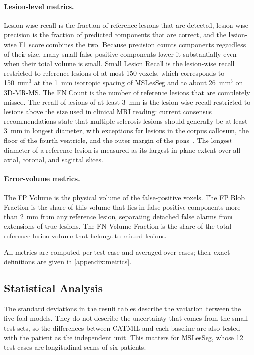 \paragraph{Lesion-level metrics.}
Lesion-wise recall is the fraction of reference lesions that are detected,
lesion-wise precision is the fraction of predicted components that are
correct, and the lesion-wise F1 score combines the two. Because precision
counts components regardless of their size, many small false-positive
components lower it substantially even when their total volume is small.
Small Lesion Recall is the lesion-wise recall restricted to reference
lesions of at most 150 voxels, which corresponds to 150~mm$^3$ at the 1~mm
isotropic spacing of MSLesSeg and to about 26~mm$^3$ on 3D-MR-MS. The FN
Count is the number of reference lesions that are completely missed. The
recall of lesions of at least 3~mm is the lesion-wise recall restricted to
lesions above the size used in clinical MRI reading: current consensus
recommendations state that multiple sclerosis lesions should generally be
at least 3~mm in longest diameter, with exceptions for lesions in the
corpus callosum, the floor of the fourth ventricle, and the outer margin
of the pons~\cite{barkhof_2024_2025,filippi_mri_2016}. The longest diameter
of a reference lesion is measured as its largest in-plane extent over all
axial, coronal, and sagittal slices.

\paragraph{Error-volume metrics.}
The FP Volume is the physical volume of the false-positive voxels. The FP
Blob Fraction is the share of this volume that lies in false-positive
components more than 2~mm from any reference lesion, separating detached
false alarms from extensions of true lesions. The FN Volume Fraction is
the share of the total reference lesion volume that belongs to missed
lesions.

All metrics are computed per test case and averaged over cases; their
exact definitions are given in \cref{appendix:metrics}.

\subsection{Statistical Analysis}
\label{sec:stats}

The standard deviations in the result tables describe the variation
between the five fold models. They do not describe the uncertainty that
comes from the small test sets, so the differences between CATMIL and each
baseline are also tested with the patient as the independent unit. This
matters for MSLesSeg, whose 12 test cases are longitudinal scans of six
patients.

